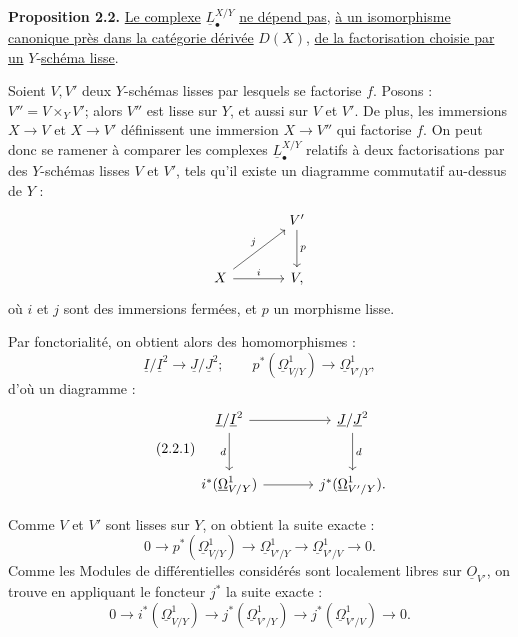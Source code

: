 
\textbf{Proposition 2.2.} \uline{Le complexe} $\underline{L}^{X/Y}_\bullet$ \uline{ne dépend pas}, \uline{à un isomorphisme canonique près dans la catégorie dérivée} $D(X)$, \uline{de la factorisation choisie par un} $Y$-\uline{schéma lisse}.

Soient $V,V'$ deux $Y$-schémas lisses par lesquels se factorise $f$. Posons : $V''=V\times_Y V'$; alors $V''$ est lisse sur $Y$, et aussi sur $V$ et $V'$. De plus, les immersions $X\to V$ et $X\to V'$ définissent une immersion $X\to V''$ qui factorise $f$. On peut donc se ramener à comparer les complexes $\underline{L}^{X/Y}_\bullet$ relatifs à deux factorisations par des $Y$-schémas lisses $V$ et $V'$, tels qu'il existe un diagramme commutatif au-dessus de $Y$ :
\[
\begin{tikzcd}[column sep=large,row sep=large]
& V' \arrow[d,"p"]\\
X \arrow[ur,"j"] \arrow[r,"i"] & V,
\end{tikzcd}
\]
où $i$ et $j$ sont des immersions fermées, et $p$ un morphisme lisse.

Par fonctorialité, on obtient alors des homomorphismes :
\[
\underline{I}/\underline{I}^2\longrightarrow \underline{J}/\underline{J}^2;
\qquad
p^*(\underline{\Omega}^1_{V/Y})\longrightarrow\underline{\Omega}^1_{V'/Y},
\]
d'où un diagramme :
\begin{equation}\tag{2.2.1}
\begin{tikzcd}[column sep=large,row sep=large]
\underline{I}/\underline{I}^2 \arrow[r] \arrow[d,"d"'] & \underline{J}/\underline{J}^2 \arrow[d,"d"]\\
i^*(\underline{\Omega}^1_{V/Y}) \arrow[r] & j^*(\underline{\Omega}^1_{V'/Y}).
\end{tikzcd}
\end{equation}

Comme $V$ et $V'$ sont lisses sur $Y$, on obtient la suite exacte :
\[
0\longrightarrow p^*(\underline{\Omega}^1_{V/Y})\longrightarrow\underline{\Omega}^1_{V'/Y}
\longrightarrow\underline{\Omega}^1_{V'/V}\longrightarrow0.
\]
Comme les Modules de différentielles considérés sont localement libres sur $\underline{O}_{V'}$, on trouve en appliquant le foncteur $j^*$ la suite exacte :
\begin{equation}\tag{2.2.2}
0\longrightarrow i^*(\underline{\Omega}^1_{V/Y})\longrightarrow j^*(\underline{\Omega}^1_{V'/Y})
\longrightarrow j^*(\underline{\Omega}^1_{V'/V})\longrightarrow0.
\end{equation}
